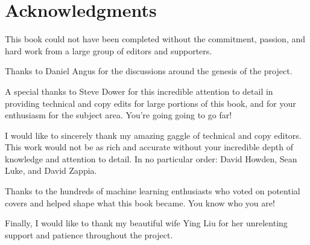 % 
% 
\chapter*{Acknowledgments}
This book could not have been completed without the commitment, passion, and hard work from a large group of editors and supporters.

Thanks to Daniel Angus for the discussions around the genesis of the project.

A special thanks to Steve Dower for this incredible attention to detail in providing technical and copy edits for large portions of this book, and for your enthusiasm for the subject area. You're going going to go far!

I would like to sincerely thank my amazing gaggle of technical and copy editors. This work would not be as rich and accurate without your incredible depth of knowledge and attention to detail. In no particular order: David Howden, Sean Luke, and David Zappia.

Thanks to the hundreds of machine learning enthusiasts who voted on potential covers and helped shape what this book became. You know who you are!

Finally, I would like to thank my beautiful wife Ying Liu for her unrelenting support and patience throughout the project.
